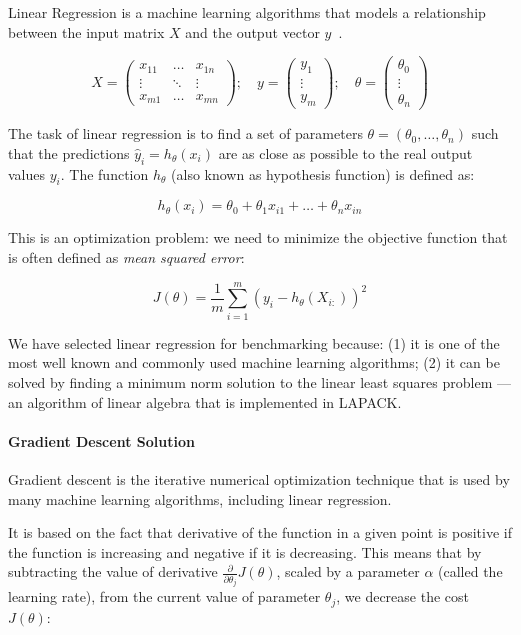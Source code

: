 \documentclass[]{ceurart}
\begin{document}
Linear Regression is a machine learning algorithms that models a relationship between the input matrix $X$ and the output vector $y$~\cite{Gero19a}.

\[ X = \begin{pmatrix}
x_{11} & \dots & x_{1n} \\
\vdots & \ddots & \vdots \\
x_{m1} & \dots & x_{mn}
\end{pmatrix};\quad
y = \begin{pmatrix}
y_{1} \\
\vdots\\
y_{m}
\end{pmatrix};\quad
\theta = \begin{pmatrix}
\theta_{0} \\
\vdots\\
\theta_{n}
\end{pmatrix}
\]

The task of linear regression is to find a set of parameters $\theta = (\theta_0, \dots, \theta_n)$ such that the predictions $\hat y_i = h_\theta(x_i)$ are as close as possible to the real output values $y_i$.
The function $h_\theta$ (also known as hypothesis function) is defined as:

\[ h_\theta(x_i) = \theta_0 + \theta_1 x_{i1} + \dots + \theta_n x_{in} \]

This is an optimization problem: we need to minimize the objective function that is often defined as \emph{mean squared error}:

\[ J(\theta) = \frac{1}{m} \sum_{i = 1}^m (y_i - h_\theta(X_{i:}))^2 \]

We have selected linear regression for benchmarking because: (1) it is one of the most well known and commonly used machine learning algorithms; (2) it can be solved by finding a minimum norm solution to the linear least squares problem --- an algorithm of linear algebra that is implemented in LAPACK.

\paragraph{Gradient Descent Solution}

Gradient descent is the iterative numerical optimization technique that is used by many machine learning algorithms, including linear regression.

It is based on the fact that derivative of the function in a given point is positive if the function is increasing and negative if it is decreasing.
This means that by subtracting the value of derivative $\frac{\partial}{\partial \theta_j} J(\theta)$, scaled by a parameter $\alpha$ (called the learning rate), from the current value of parameter $\theta_j$, we decrease the cost $J(\theta)$:
\end{document}
